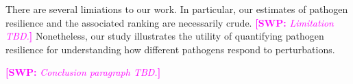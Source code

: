 \documentclass[12pt]{article}
\newcommand{\comment}{\showcomment}
\newcommand{\showcomment}[3]{\textcolor{#1}{\textbf{[#2: }\textsl{#3}\textbf{]}}}
\newcommand{\swp}[1]{\comment{magenta}{SWP}{#1}}
\begin{document}
There are several limiations to our work.
In particular, our estimates of pathogen resilience and the associated ranking are necessarily crude.
\swp{Limitation TBD.}
Nonetheless, our study illustrates the utility of quantifying pathogen resilience for understanding how different pathogens respond to perturbations.

\swp{Conclusion paragraph TBD.}
\end{document}
